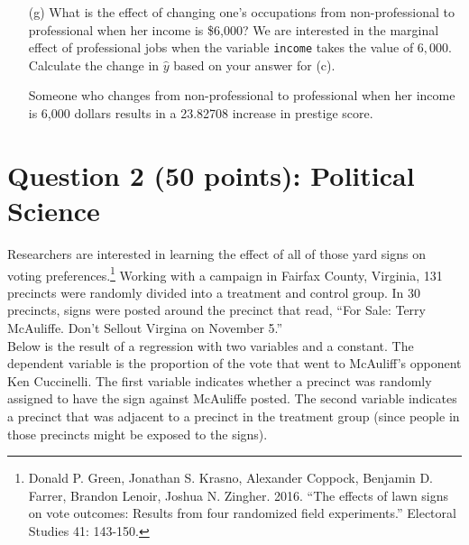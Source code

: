 \documentclass[12pt,letterpaper]{article}
\begin{document}
\begin{enumerate}
\noindent  The eﬀect of a 1,000 dollar increase in income on prestige score for professional occupation is an increase of 59.76874 on the Pineo-Porter prestige score
\vspace{3cm}
	
	\item [(g)]
	What is the effect of changing one's occupations from non-professional to professional when her income is \$6,000? We are interested in the marginal effect of professional jobs when the variable \texttt{income} takes the value of $6,000$. Calculate the change in $\hat{y}$ based on your answer for (c).
\vspace{1cm}
	
\vspace{1cm}

\noindent Someone who changes from non-professional to professional when her income is 6,000 dollars results in a 23.82708 increase in prestige score.
	
\end{enumerate}

\newpage

\section*{Question 2 (50 points): Political Science}
\vspace{.25cm}
\noindent 	Researchers are interested in learning the effect of all of those yard signs on voting preferences.\footnote{Donald P. Green, Jonathan	S. Krasno, Alexander Coppock, Benjamin D. Farrer,	Brandon Lenoir, Joshua N. Zingher. 2016. ``The effects of lawn signs on vote outcomes: Results from four randomized field experiments.'' Electoral Studies 41: 143-150. } Working with a campaign in Fairfax County, Virginia, 131 precincts were randomly divided into a treatment and control group. In 30 precincts, signs were posted around the precinct that read, ``For Sale: Terry McAuliffe. Don't Sellout Virgina on November 5.'' \\

Below is the result of a regression with two variables and a constant.  The dependent variable is the proportion of the vote that went to McAuliff's opponent Ken Cuccinelli. The first variable indicates whether a precinct was randomly assigned to have the sign against McAuliffe posted. The second variable indicates
a precinct that was adjacent to a precinct in the treatment group (since people in those precincts might be exposed to the signs).  \\
\end{document}
